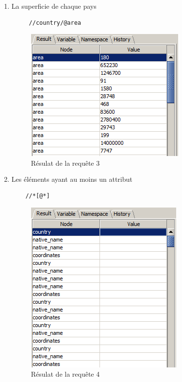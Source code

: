 \documentclass{article}
\begin{document}
\begin{enumerate}[1)]
\item La superficie de chaque pays \\
     \begin{lstlisting}
     //country/@area
    \end{lstlisting}

  
    \begin{figure}[h!]
    \centering
    \includegraphics[scale=1]{query3.PNG}
    \caption{Résulat de la requête 3}
    \end{figure}

\newpage
\item Les éléments ayant au moins un attribut \\
    \begin{lstlisting}
    //*[@*]
    \end{lstlisting}
    
   
    \begin{figure}[h!]
    \centering
    \includegraphics[scale=1]{query4.PNG}
    \caption{Résulat de la requête 4}
    \end{figure}



\end{enumerate}
\end{document}
